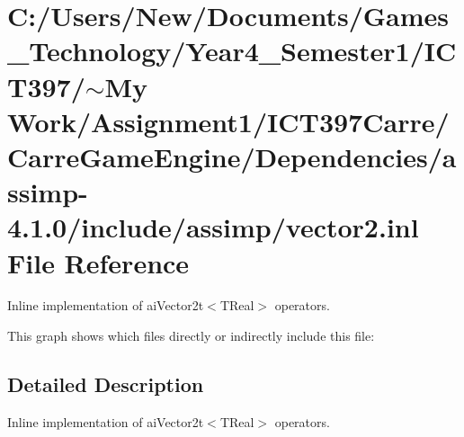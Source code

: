 \hypertarget{vector2_8inl}{
\section{C:/Users/New/Documents/Games\_\-Technology/Year4\_\-Semester1/ICT397/$\sim$My Work/Assignment1/ICT397Carre/CarreGameEngine/Dependencies/assimp-4.1.0/include/assimp/vector2.inl File Reference}
\label{vector2_8inl}
}
Inline implementation of aiVector2t$<$TReal$>$ operators. 



This graph shows which files directly or indirectly include this file:

\subsection{Detailed Description}
Inline implementation of aiVector2t$<$TReal$>$ operators. 


